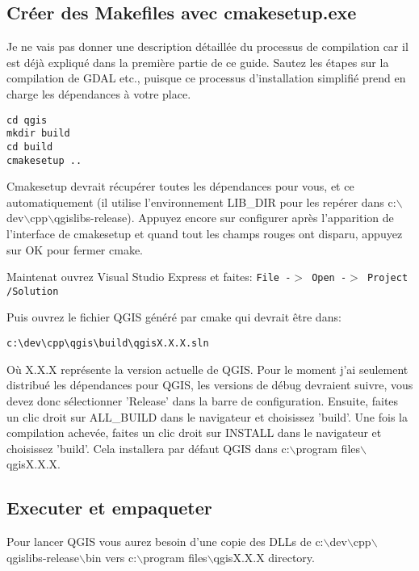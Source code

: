 \subsection{Cr\'eer des Makefiles avec cmakesetup.exe}
Je ne vais pas donner une description d\'etaill\'ee du processus de compilation car il est d\'ej\`a expliqu\'e dans la premi\`ere partie de ce guide. Sautez les \'etapes sur la compilation de GDAL etc., puisque ce processus d'installation simplifi\'e prend en charge les d\'ependances \`a votre place.

\begin{verbatim}
cd qgis
mkdir build
cd build
cmakesetup ..
\end{verbatim}

Cmakesetup devrait r\'ecup\'erer toutes les d\'ependances pour vous, et ce automatiquement (il utilise l'environnement LIB\_DIR pour les rep\'erer dans c:$\backslash$dev$\backslash$cpp$\backslash$qgislibs-release). 
Appuyez encore sur configurer apr\`es l'apparition de l'interface de cmakesetup et quand tout les champs rouges ont disparu, appuyez sur OK pour fermer cmake.

Maintenat ouvrez Visual Studio Express et faites: \texttt{File -$>$ Open -$>$ Project /Solution}

Puis ouvrez le fichier QGIS g\'en\'er\'e par cmake qui devrait \^etre dans:

\begin{verbatim}
c:\dev\cpp\qgis\build\qgisX.X.X.sln
\end{verbatim}

O\`u X.X.X repr\'esente la version actuelle de QGIS. Pour le moment j'ai seulement distribu\'e les d\'ependances pour QGIS, les versions de d\'ebug devraient suivre, vous devez donc s\'electionner 'Release' dans la barre de configuration. Ensuite, faites un clic droit sur ALL\_BUILD dans le navigateur et choisissez 'build'. Une fois la compilation achev\'ee, faites un clic droit sur INSTALL dans le navigateur et choisissez 'build'. Cela installera par d\'efaut QGIS dans c:$\backslash$program files$\backslash$qgisX.X.X.

\subsection{Executer et empaqueter}
Pour lancer QGIS vous aurez besoin d'une copie des DLLs de c:$\backslash$dev$\backslash$cpp$\backslash$qgislibs-release$\backslash$bin vers c:$\backslash$program files$\backslash$qgisX.X.X directory.